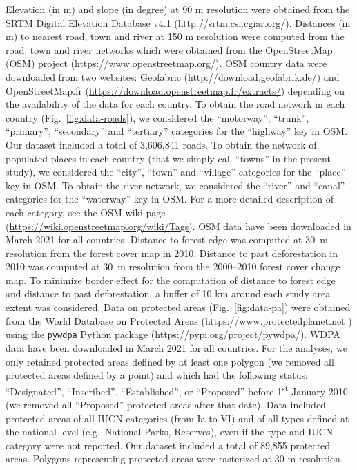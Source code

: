 \documentclass[
  12pt,
]{article}
\begin{document}
Elevation (in m) and slope (in degree) at 90 m resolution were obtained from the SRTM Digital Elevation Database v4.1 (\url{http://srtm.csi.cgiar.org/}). Distances (in m) to nearest road, town and river at 150 m resolution were computed from the road, town and river networks which were obtained from the OpenStreetMap (OSM) project (\url{https://www.openstreetmap.org/}). OSM country data were downloaded from two websites: Geofabric (\url{http://download.geofabrik.de/}) and OpenStreetMap.fr (\url{https://download.openstreetmap.fr/extracts/}) depending on the availability of the data for each country. To obtain the road network in each country (Fig.~\ref{fig:data-roads}), we considered the ``motorway'', ``trunk'', ``primary'', ``secondary'' and ``tertiary'' categories for the ``highway'' key in OSM. Our dataset included a total of 3,606,841 roads. To obtain the network of populated places in each country (that we simply call ``towns'' in the present study), we considered the ``city'', ``town'' and ``village'' categories for the ``place'' key in OSM. To obtain the river network, we considered the ``river'' and ``canal'' categories for the ``waterway'' key in OSM. For a more detailed description of each category, see the OSM wiki page (\url{https://wiki.openstreetmap.org/wiki/Tags}). OSM data have been downloaded in March 2021 for all countries. Distance to forest edge was computed at 30~m resolution from the forest cover map in 2010. Distance to past deforestation in 2010 was computed at 30~m resolution from the 2000--2010 forest cover change map. To minimize border effect for the computation of distance to forest edge and distance to past deforestation, a buffer of 10 km around each study area extent was considered. Data on protected areas (Fig.~\ref{fig:data-pa}) were obtained from the World Database on Protected Areas (\url{https://www.protectedplanet.net} \citep{WDPA2020}) using the \texttt{pywdpa} Python package (\url{https://pypi.org/project/pywdpa/}). WDPA data have been downloaded in March 2021 for all countries. For the analyses, we only retained protected areas defined by at least one polygon (we removed all protected areas defined by a point) and which had the following status: ``Designated'', ``Inscribed'', ``Established'', or ``Proposed'' before 1\textsuperscript{st} January 2010 (we removed all ``Proposed'' protected areas after that date). Data included protected areas of all IUCN categories (from Ia to VI) and of all types defined at the national level (e.g.~National Parks, Reserves), even if the type and IUCN category were not reported. Our dataset included a total of 89,855 protected areas. Polygons representing protected areas were rasterized at 30 m resolution.\\
\end{document}
